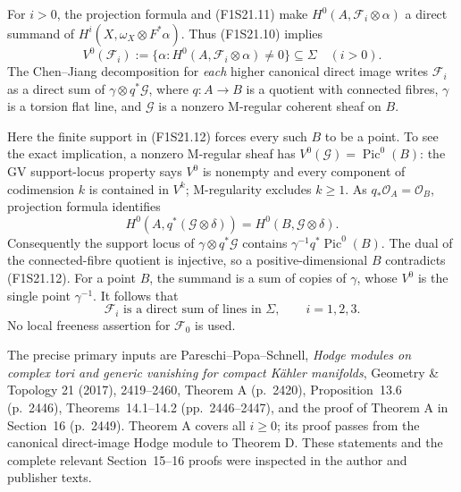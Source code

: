 For $i>0$, the projection formula and (F1S21.11) make
$H^0(A,\mathcal F_i\otimes\alpha)$ a direct summand of
$H^i(X,\omega_X\otimes F^*\alpha)$. Thus (F1S21.10)
implies
\[
 V^0(\mathcal F_i):=
 \{\alpha:H^0(A,\mathcal F_i\otimes\alpha)\ne0\}
                           \subseteq\Sigma\quad(i>0).
 \tag{F1S21.12}
\]
The Chen--Jiang decomposition for \emph{each} higher
canonical direct image writes $\mathcal F_i$ as a direct
sum of $\gamma\otimes q^*\mathcal G$, where $q:A\to B$
is a quotient with connected fibres, $\gamma$ is a
torsion flat line, and $\mathcal G$ is a nonzero
M-regular coherent sheaf on $B$.

Here the finite support in (F1S21.12) forces every such
$B$ to be a point. To see the exact implication, a nonzero
M-regular sheaf has $V^0(\mathcal G)=\operatorname{Pic}^0(B)$:
the GV support-locus property says $V^0$ is nonempty and
every component of codimension $k$ is contained in $V^k$;
M-regularity excludes $k\ge1$. As $q_*\mathcal O_A=\mathcal O_B$,
projection formula identifies
\[
 H^0(A,q^*(\mathcal G\otimes\delta))
                      =H^0(B,\mathcal G\otimes\delta).
 \tag{F1S21.13}
\]
Consequently the support locus of $\gamma\otimes q^*\mathcal G$
contains $\gamma^{-1}q^*\operatorname{Pic}^0(B)$.
The dual of the connected-fibre quotient is injective,
so a positive-dimensional $B$ contradicts (F1S21.12).
For a point $B$, the summand is a sum of copies of
$\gamma$, whose $V^0$ is the single point $\gamma^{-1}$.
It follows that
\[
 \mathcal F_i\text{ is a direct sum of lines in }\Sigma,
                         \qquad i=1,2,3.
 \tag{F1S21.14}
\]
No local freeness assertion for $\mathcal F_0$ is used.

The precise primary inputs are Pareschi--Popa--Schnell,
\emph{Hodge modules on complex tori and generic vanishing
for compact K\"ahler manifolds}, Geometry \& Topology
21 (2017), 2419--2460, Theorem A (p.~2420),
Proposition~13.6 (p.~2446), Theorems~14.1--14.2
(pp.~2446--2447), and the proof of Theorem A in
Section~16 (p.~2449). Theorem A covers all $i\ge0$;
its proof passes from the canonical direct-image Hodge
module to Theorem D. These statements and the complete
relevant Section~15--16 proofs were inspected in the
author and publisher texts.

